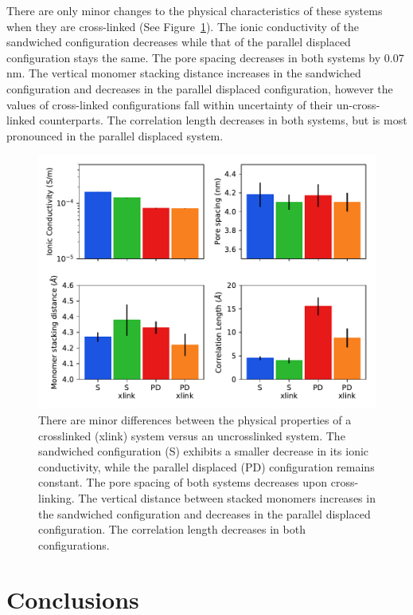 \documentclass[journal=jpcbfk,manuscript=article]{achemso}
\begin{document}
  There are only minor changes to the physical characteristics of these systems when 
  they are cross-linked (See Figure~\ref{fig:xlink}). The ionic conductivity of 
  the sandwiched configuration decreases while that of the parallel displaced 
  configuration stays the same. The pore spacing decreases in both systems by
  0.07 nm. The vertical monomer stacking distance increases in the sandwiched
  configuration and decreases in the parallel displaced configuration, however the 
  values of cross-linked configurations fall within uncertainty of their un-cross-linked
  counterparts. The correlation length decreases in both systems, 
  but is most pronounced in the parallel displaced system.  
  
  \begin{figure}[!htb]
  \centering
  \includegraphics[width=\textwidth]{xlink_charts.pdf}
  \caption{There are minor differences between the physical properties of a
  crosslinked (xlink) system versus an uncrosslinked system. The sandwiched configuration (S)
  exhibits a smaller decrease in its ionic conductivity, while the parallel displaced (PD)
  configuration remains constant. The pore spacing of both systems decreases upon cross-linking.
  The vertical distance between stacked monomers increases in the sandwiched configuration
  and decreases in the parallel displaced configuration. The correlation length decreases
  in both configurations.}\label{fig:xlink}
  \end{figure}
 
  \section{Conclusions}
   
\end{document}

